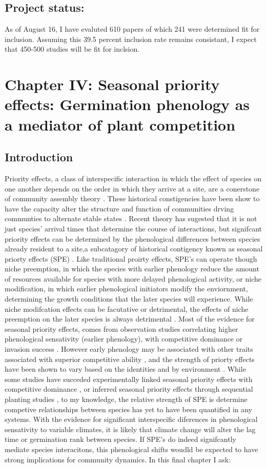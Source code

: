 \documentclass{article}\usepackage[]{graphicx}\usepackage[]{color}
\begin{document}
{\subsection*{Project status:}
As of August 16, I have evaluted 610 papers of which 241 were determined fit for inclusion. Assuming this 39.5 percent inclusion rate remains consistant, I expect that 450-500 studies will be fit for inclsion.
\section*{Chapter IV: Seasonal priority effects: Germination phenology as a mediator of plant competition}
\subsection*{Introduction}
\indent Priority effects, a class of interspecific interaction in which the effect of species on one another depends on the order in which they arrive at a site, are a conerstone of community assembly theory \citep{Fukami2015}. These historical constigencies have been show to have the capacity alter the structure and function of communities drving communties to alternate stable states \citep{Fukami2011}. Recent theory has sugested that it is not just species' arrival times that determine the course of interactions, but signifcant priority effects can be determined by the phenological differences between species already resident to a site,a subcatagory of historical contigency known as seasonal priorty effects (SPE) \citep{Wainwright2012}. Like traditional proirty effects, SPE's can operate though niche preemption, in which the species with earlier phenology reduce the amount of resources available for species with more delayed phenological activity, or niche modification, in which earlier phenological initiators modify the enviornment, determining the growth conditions that the later species will experience. While niche modifcation effects can be facutative or detrimental, the effects of niche preemption on the later species is always detrimental \citep{Fukami2015}. Most of the evidence for seasonal priority effects, comes from observation studies correlating higher phenological sensativity (earlier phenology), with competitive dominance or invasion success \citep{Gioria2018}. However early phenology may be associated with other traits associated with superior competitive ability \citep{Dickson2012}, and the strength of priorty effects have been shown to vary based on the identities \citep{Cleland2015} and by environment \citep{Kardol2013}.  While some studies have succeded experimentally linked seasonal priority effects with competitive dominance \citep{Wainwright2012}, or inferred seasonal priority effects through sequential planting studies \citep{Korner2008}, to my knowledge, the relative strength of SPE is determine competive relationships between species has yet to have been quantified in any systems. With the evidence for significant interspecific diferences in phenological sensativity to variable climates, it is likely that climate change will alter the lag time or germination rank between species. If SPE's do indeed signifcantly mediate species interacitons, this phenological shifts woudld be expected to have strong implications for community dynamics. In this final chapter I ask:
}
\end{document}
